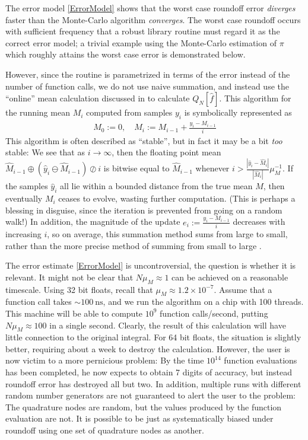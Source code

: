 \documentclass{ansarticle}
\begin{document}
The error model \ref{ErrorModel} shows that the worst case roundoff error \emph{diverges} faster than the Monte-Carlo algorithm \emph{converges}.
The worst case roundoff occurs with sufficient frequency that a robust library routine must regard it as the correct error model; a trivial example using the Monte-Carlo estimation of $\pi$ which roughly attains the worst case error is demonstrated below.


However, since the routine is parametrized in terms of the error instead of the number of function calls, we do not use naive summation, and instead use the ``online'' mean calculation discussed in \citep{knuth1997art} to calculate $Q_{N}[\hat{f}]$.
This algorithm for the running mean $M_{i}$ computed from samples $y_{i}$ is symbolically represented as 
\begin{align*}
M_{0} := 0, \quad M_{i} := M_{i-1} + \frac{y_{i} - M_{i-1}}{i}
\end{align*}
This algorithm is often described as ``stable'', but in fact it may be a bit \emph{too} stable: We see that as $i \to \infty$, then the floating point mean $\hat{M}_{i-1}\oplus (\hat{y}_{i}\ominus \hat{M}_{i-1})\oslash i$ is bitwise equal to $\hat{M}_{i-1}$ whenever $i > \frac{|\hat{y}_{i}- \hat{M}_{i}|}{|\hat{M}_{i}|} \mu_{M}^{-1}$.
If the samples $\hat{y}_{i}$ all lie within a bounded distance from the true mean $M$, then eventually $M_{i}$ ceases to evolve, wasting further computation.
(This is perhaps a blessing in disguise, since the iteration is prevented from going on a random walk!)
In addition, the magnitude of the update $e_{i} :=  \frac{y_{i} - M_{i-1}}{i}$ decreases with increasing $i$, so on average, this summation method sums from large to small, rather than the more precise method of summing from small to large \citep{higham1993accuracy}.


The error estimate \ref{ErrorModel} is uncontroversial, the question is whether it is relevant.
It might not be clear that $N\mu_{M}\approx 1$ can be achieved on a reasonable timescale.
Using 32 bit floats, recall that $\mu_{M} \approx 1.2\times10^{-7}$.
Assume that a function call takes ${\sim}\SI{100}{\nano \second}$, and we run the algorithm on a chip with 100 threads.
This machine will be able to compute $10^{9}$ function calls/second, putting $N\mu_{M} \approx 100$ in a single second.
Clearly, the result of this calculation will have little connection to the original integral.
For 64 bit floats, the situation is slightly better, requiring about a week to destroy the calculation.
However, the user is now victim to a more pernicious problem: By the time $10^{14}$ function evaluations has been completed, he now expects to obtain 7 digits of accuracy, but instead roundoff error has destroyed all but two.
In addition, multiple runs with different random number generators are not guaranteed to alert the user to the problem: The quadrature nodes are random, but the values produced by the function evaluation are not.
It is possible to be just as systematically biased under roundoff using one set of quadrature nodes as another. 
\end{document}
